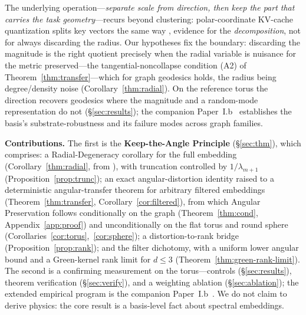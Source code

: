\documentclass[11pt]{article}
\theoremstyle{remark}
\begin{document}
The underlying operation---\emph{separate scale from direction, then keep the
part that carries the task geometry}---recurs beyond clustering: polar-coordinate
KV-cache quantization splits key vectors the same way \cite{polarquant2025},
evidence for the \emph{decomposition}, not for always discarding the radius. Our
hypotheses fix the boundary: discarding the magnitude is the right quotient
precisely when the radial variable is nuisance for the metric preserved---the
tangential-noncollapse condition (A2) of Theorem~\ref{thm:transfer}---which for
graph geodesics holds, the radius being degree/density noise
(Corollary~\ref{thm:radial}). On the reference torus the direction recovers
geodesics where the magnitude and a random-mode representation do not
(\S\ref{sec:results}); the companion Paper~I.b~\cite{paperIb} establishes the
basis's substrate-robustness and its failure modes across graph families.

\textbf{Contributions.} The first is the \textbf{Keep-the-Angle Principle}
(\S\ref{sec:thm}), which comprises: a Radial-Degeneracy corollary for the full
embedding (Corollary~\ref{thm:radial}, from \cite{vonluxburg2014}), with truncation
controlled by $1/\lambda_{m+1}$ (Proposition~\ref{prop:trunc}); an exact
angular-distortion identity raised to a deterministic angular-transfer theorem for
arbitrary filtered embeddings (Theorem~\ref{thm:transfer},
Corollary~\ref{cor:filtered}), from which Angular Preservation follows conditionally
on the graph (Theorem~\ref{thm:cond}, Appendix~\ref{app:proof}) and unconditionally
on the flat torus and round sphere (Corollaries~\ref{cor:torus},~\ref{cor:sphere});
a distortion-to-rank bridge (Proposition~\ref{prop:rank}); and the filter dichotomy,
with a uniform lower angular bound and a Green-kernel rank limit for $d\le3$
(Theorem~\ref{thm:green-rank-limit}). The second is a confirming measurement on the
torus---controls (\S\ref{sec:results}), theorem verification (\S\ref{sec:verify}),
and a weighting ablation (\S\ref{sec:ablation}); the extended empirical program is
the companion Paper~I.b~\cite{paperIb}. We do not claim to derive physics: the core
result is a basis-level fact about spectral embeddings.
\end{document}

